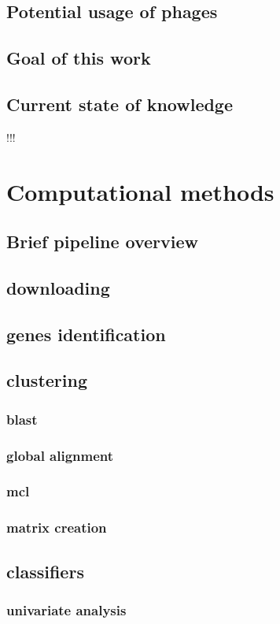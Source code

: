 \section{Potential usage of phages}
\section{Goal of this work}
\section{Current state of knowledge} !!!


\chapter{Computational methods}
\section{Brief pipeline overview}
\section{downloading}
\section{genes identification}
\section{clustering}
\subsection{blast}
\subsection{global alignment}
\subsection{mcl}
\subsection{matrix creation}
\section{classifiers}
\subsection{univariate analysis}
